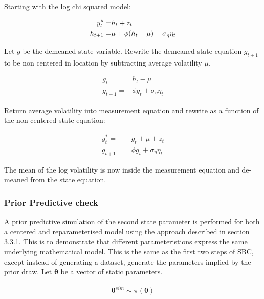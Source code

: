\documentclass[12pt, a4paper]{article}
\begin{document}
        Starting with the log chi squared model:

        $$
        \begin{aligned}
        y^{\ast}_t =& h_t + z_t \\
        h_{t+1} =& \space \mu +\phi(h_t - \mu) + \sigma_{\eta} \eta_t
        \end{aligned}
        $$
        

        Let $g$ be the demeaned state variable. Rewrite the demeaned state equation $g_{t+1}$ to be non centered in location by subtracting average volatility $\mu$.

        $$
        \begin{aligned}
        g_t =& h_t - \mu \\
        g_{t+1} =& \phi g_t + \sigma_{\eta}\eta_{t}
        \end{aligned}
        $$

        Return average volatility into measurement equation and rewrite as a function of the non centered state equation:

        $$
        \begin{aligned}
        y^{\ast}_t =& g_t + \mu + z_t \\
        g_{t+1} =& \phi g_t + \sigma_{\eta}\eta_{t}
        \end{aligned}
        $$

        The mean of the log volatility is now inside the measurement equation and de-meaned from the state equation.
    
    \subsubsection{Prior Predictive check}

        A prior predictive simulation of the second state parameter is performed for both a centered and reparameterised model using the approach described in section 3.3.1. This is to demonstrate that different parameteristions express the same underlying mathematical model. This is the same as the first two steps of SBC, except instead of generating a dataset, generate the parameters implied by the prior draw. Let $\boldsymbol{\theta}$ be a vector of static parameters.

        $$
        \begin{aligned}
        \boldsymbol{\theta}^{sim} \sim \pi(\boldsymbol{\theta})
        \end{aligned}
        $$
\end{document}
